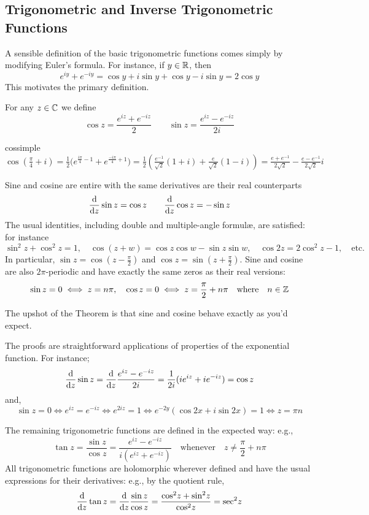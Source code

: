 \clearpage




\subsection[Trigonometric Functions]{Trigonometric and Inverse Trigonometric Functions}%

A sensible definition of the basic trigonometric functions comes simply by modifying Euler's formula. For instance, if $y\in\mathbb{R}$, then
\[
	e^{iy}+e^{-iy}=\cos y+i\sin y+\cos y-i\sin y=2\cos y
\]
This motivates the primary definition.

\begin{defn}{}{}
	For any $z\in\mathbb{C}$ we define
	\[
		\cos z=\frac{e^{iz}+e^{-iz}}2
		\qquad
		\sin z=\frac{e^{iz}-e^{-iz}}{2i}
	\]
\end{defn}

\begin{example}{}{cossimple}
	$\cos(\frac\pi 4+i)=\frac 12\bigl(e^{\frac{i\pi}4-1}+e^{\frac{-i\pi}4+1}\bigr)=\frac 12\left(\frac{e^{-1}}{\sqrt 2}(1+i)+\frac{e}{\sqrt 2}(1-i)\right) =\frac{e+e^{-1}}{2\sqrt 2}-\frac{e-e^{-1}}{2\sqrt 2}i$
\end{example}

\begin{thm}{}{}
	Sine and cosine are entire with the same derivatives are their real counterparts
	\[
		\frac{\mathrm{d} }{\mathrm{d} z}\sin z=\cos z\qquad \frac{\mathrm{d} }{\mathrm{d} z}\cos z=-\sin z
	\]
	The usual identities, including double and multiple-angle formulæ, are satisfied: for instance
	\[
		\sin^2\!z+\cos^2\!z=1,\quad \cos(z+w)=\cos z\cos w-\sin z\sin w,\quad \cos 2z=2\cos^2\!z-1,\quad\text{etc.}
	\]
	In particular, $\sin z=\cos(z-\frac \pi 2)$ and $\cos z=\sin(z+\frac\pi 2)$. Sine and cosine are also $2\pi$-periodic and have exactly the same zeros as their real versions:
	\[
		\sin z=0\iff z=n\pi,\quad \cos z=0\iff z=\frac\pi 2+n\pi
		\quad\text{where}\quad
		n\in\mathbb{Z}
	\]
\end{thm}

The upshot of the Theorem is that sine and cosine behave exactly as you'd expect.\smallbreak

The proofs are straightforward applications of properties of the exponential function. For instance;
\[
	\frac{\mathrm{d} }{\mathrm{d} z}\sin z = \frac{\mathrm{d} }{\mathrm{d} z}\frac{e^{iz}-e^{-iz}}{2i} =\frac 1{2i}(ie^{iz}+ie^{-iz}) =\cos z
\]
and,
\[
	\sin z=0\iff e^{iz}=e^{-iz}\iff e^{2iz}=1\iff e^{-2y}(\cos 2x+i\sin 2x)=1\iff z=\pi n
\]


The remaining trigonometric functions are defined in the expected way: e.g.,
\[
	\tan z=\frac{\sin z}{\cos z}=\frac{e^{iz}-e^{-iz}}{i(e^{iz}+e^{-iz})}
	\quad\text{whenever}\quad
	z\neq \frac\pi 2+n\pi
\]
All trigonometric functions are holomorphic wherever defined and have the usual expressions for their derivatives: e.g., by the quotient rule,
\[
	\frac{\mathrm{d} }{\mathrm{d} z}\tan z =\frac{\mathrm{d} }{\mathrm{d} z}\frac{\sin z}{\cos z} =\frac{\cos^2\!z+\sin^2\!z}{\cos^2\!z}=\sec^2\!z
\]

